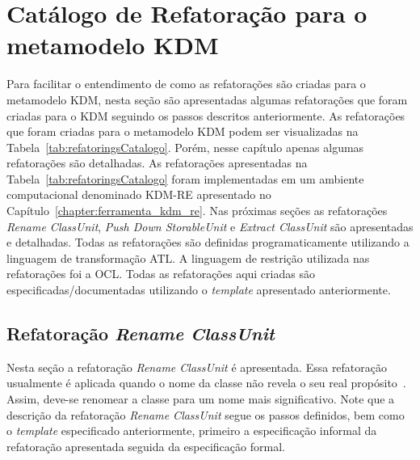 \section{Catálogo de Refatoração para o metamodelo KDM}\label{sec:catalogo_refatoracao_kdm}

Para facilitar o entendimento de como as refatorações são criadas para o metamodelo KDM, nesta seção são apresentadas algumas refatorações que foram criadas para o KDM seguindo os passos descritos anteriormente. As refatorações que foram criadas para o metamodelo KDM podem ser visualizadas na Tabela~\ref{tab:refatoringsCatalogo}. Porém, nesse capítulo apenas algumas refatorações são detalhadas. As refatorações apresentadas na Tabela~\ref{tab:refatoringsCatalogo} foram implementadas em um ambiente computacional denominado KDM-RE apresentado no Capítulo~\ref{chapter:ferramenta_kdm_re}. Nas próximas seções as refatorações \textit{Rename ClassUnit}, \textit{Push Down StorableUnit} e \textit{Extract ClassUnit} são apresentadas e detalhadas. Todas as refatorações são definidas programaticamente utilizando a linguagem de transformação ATL. A linguagem de restrição utilizada nas refatorações foi a OCL. Todas as refatorações aqui criadas são especificadas/documentadas utilizando o \textit{template} apresentado anteriormente.



\subsection{Refatoração \textit{Rename ClassUnit}}
Nesta seção a refatoração \textit{Rename ClassUnit} é apresentada. Essa refatoração usualmente é aplicada quando o nome da classe não revela o seu real propósito~\cite{Fowler1999}. Assim, deve-se renomear a classe para um nome mais significativo. Note que a descrição da refatoração \textit{Rename ClassUnit} segue os passos definidos, bem como o \textit{template} especificado anteriormente, primeiro a especificação informal da refatoração apresentada seguida da especificação formal.

